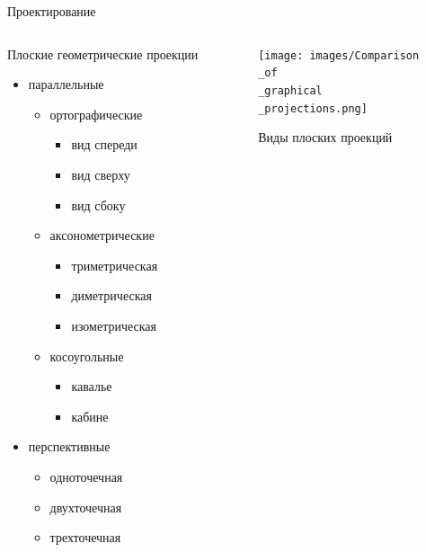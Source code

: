 \documentclass{beamer}
\begin{document}
	\begin{frame}{Проектирование}
		

		\begin{columns}
			\begin{column}{0.55\textwidth}

		Плоские геометрические проекции
		\begin{itemize}
			\item параллельные
			\begin{itemize}
				\item ортографические
				\begin{itemize}
					\item вид спереди
					\item вид сверху
					\item вид сбоку
				\end{itemize}
				\item аксонометрические
				\begin{itemize}
					\item триметрическая
					\item диметрическая
					\item изометрическая
				\end{itemize}
				\item косоугольные
				\begin{itemize}
					\item кавалье
					\item кабине 
				\end{itemize}
			\end{itemize}
			\item перспективные
			\begin{itemize}
				\item одноточечная
				\item двухточечная
				\item трехточечная
			\end{itemize}
		\end{itemize}

			\end{column}
			\begin{column}{0.45\textwidth}
				\begin{figure} 
						\texttt{[image: images/Comparison\\\_of\\\_graphical\\\_projections.png]}
					\caption{Виды плоских проекций}
				\end{figure}
			\end{column}
		\end{columns}
		
	\end{frame}
\end{document}
